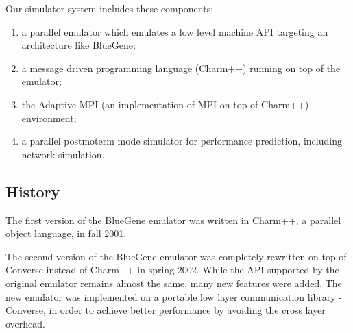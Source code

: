 \documentclass[10pt]{article}
\begin{document}
Our simulator system includes these components: 
\begin{enumerate}
        \item a parallel emulator which emulates a low level machine API targeting an architecture like BlueGene; 
\item a message driven programming language (Charm++) running on top of the emulator; 
        \item the Adaptive MPI (an implementation of MPI on top of Charm++) environment; 
        \item a parallel postmoterm mode simulator for performance prediction, including network simulation. 
\end{enumerate}

\subsection{History}

        The first version of the BlueGene emulator was written in Charm++, a 
parallel object language, in fall 2001. 

        The second version of the BlueGene emulator was completely rewritten on top 
of Converse instead of Charm++ in spring 2002. 
        While the API supported by the original emulator remains almost the same,
many new features were added.
The new emulator was implemented on a portable low layer communication 
library - Converse, in order to achieve better 
performance by avoiding the cross layer overhead.
\end{document}

